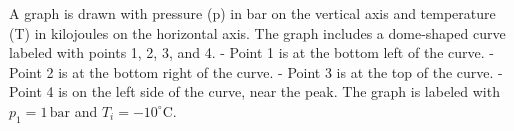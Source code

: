 A graph is drawn with pressure (p) in bar on the vertical axis and temperature (T) in kilojoules on the horizontal axis. The graph includes a dome-shaped curve labeled with points 1, 2, 3, and 4.  
- Point 1 is at the bottom left of the curve.  
- Point 2 is at the bottom right of the curve.  
- Point 3 is at the top of the curve.  
- Point 4 is on the left side of the curve, near the peak.  
The graph is labeled with \( p_1 = 1 \, \text{bar} \) and \( T_i = -10^\circ \text{C} \).